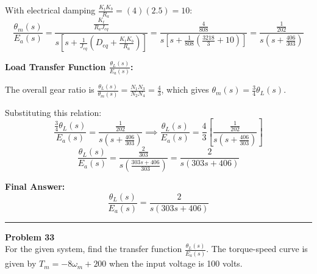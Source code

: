 \documentclass[11pt]{article}
\begin{document}
With electrical damping $\frac{K_t K_b}{R_a} = (4)(2.5) = 10$:
\[
\frac{\theta_m(s)}{E_a(s)} = \frac{\frac{K_t}{R_a J_{eq}}}{s\left[s + \frac{1}{J_{eq}}\left(D_{eq} + \frac{K_t K_b}{R_a}\right)\right]} = \frac{\frac{4}{808}}{s\left[s + \frac{1}{808}\left(\frac{3218}{3} + 10\right)\right]} = \frac{\frac{1}{202}}{s\left(s + \frac{406}{303}\right)}
\]

\vspace{5pt}
\noindent\textbf{Load Transfer Function $\frac{\theta_L(s)}{E_a(s)}$:}
\vspace{5pt}

The overall gear ratio is $\frac{\theta_L(s)}{\theta_m(s)} = \frac{N_1 N_3}{N_2 N_4} = \frac{4}{3}$, which gives $\theta_m(s) = \frac{3}{4} \theta_L(s)$. 
\vspace{5pt}

Substituting this relation:
\[
\frac{\frac{3}{4}\theta_L(s)}{E_a(s)} = \frac{\frac{1}{202}}{s\left(s + \frac{406}{303}\right)} \implies \frac{\theta_L(s)}{E_a(s)} = \frac{4}{3} \left[ \frac{\frac{1}{202}}{s\left(s + \frac{406}{303}\right)} \right]
\]
\[
\frac{\theta_L(s)}{E_a(s)} = \frac{\frac{2}{303}}{s\left(\frac{303s + 406}{303}\right)} = \frac{2}{s(303s + 406)}
\]

\vspace{5pt}
\noindent\textbf{Final Answer:}
\[
\boxed{
\frac{\theta_L(s)}{E_a(s)} = \frac{2}{s(303s + 406)}
}
\]









\newpage
  \setcounter{page}{64}  
\noindent\rule{\textwidth}{1pt}
\noindent\textbf{Problem 33} \hfill 
\\ For the given system, find the transfer function $\frac{\theta_L(s)}{E_a(s)}$. The torque-speed curve is given by $T_{m} = -8\omega_{m} + 200$ when the input voltage is 100 volts.
\end{document}
